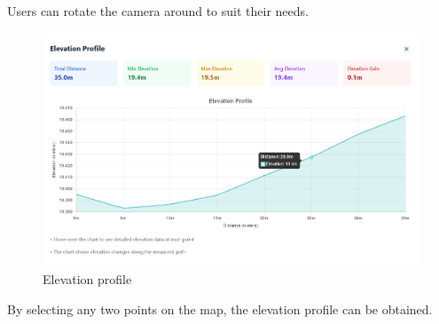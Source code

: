 Users can rotate the camera around to suit their needs.

\begin{figure}[H]
    \centering
    \includegraphics[scale=0.3]{figures/elevation_profile.png}
    \caption{Elevation profile}
\end{figure}

By selecting any two points on the map, the elevation profile can be obtained.

